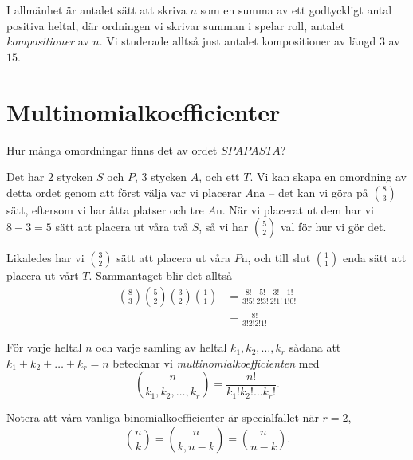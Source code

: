 \documentclass[nobib]{tufte-handout}
\begin{document}
\begin{definition}
  I allmänhet är antalet sätt att skriva $n$ som en summa av ett godtyckligt antal positiva heltal, där ordningen vi skrivar summan i spelar roll, antalet \emph{kompositioner} av $n$. Vi studerade alltså just antalet kompositioner av längd $3$ av $15$.
\end{definition}

\section{Multinomialkoefficienter}

\begin{example}
  Hur många omordningar finns det av ordet $SPAPASTA$?

  Det har $2$ stycken $S$ och $P$, $3$ stycken $A$, och ett $T$. Vi kan skapa en omordning av detta ordet genom att först välja var vi placerar $A$na -- det kan vi göra på $\binom{8}{3}$ sätt, eftersom vi har åtta platser och tre $A$n. När vi placerat ut dem har vi $8 - 3 = 5$ sätt att placera ut våra två $S$, så vi har $\binom{5}{2}$ val för hur vi gör det.

  Likaledes har vi $\binom{3}{2}$ sätt att placera ut våra $P$n, och till slut $\binom{1}{1}$ enda sätt att placera ut vårt $T$. Sammantaget blir det alltså
  \begin{align*}
    \binom{8}{3}\binom{5}{2}\binom{3}{2}\binom{1}{1} &= \frac{8!}{3!5!}\frac{5!}{2!3!}\frac{3!}{2!1!}\frac{1!}{1!0!}\\
    &= \frac{8!}{3!2!2!1!}
  \end{align*}
\end{example}

\begin{definition}
  För varje heltal $n$ och varje samling av heltal $k_1, k_2, \ldots, k_r$ sådana att $k_1 + k_2 + \ldots + k_r = n$ betecknar vi \emph{multinomialkoefficienten} med
  $$\binom{n}{k_1, k_2, \ldots, k_r} = \frac{n!}{k_1!k_2!\ldots k_r!}.$$

  Notera att våra vanliga binomialkoefficienter är specialfallet när $r=2$,
  $$\binom{n}{k} = \binom{n}{k, n-k} = \binom{n}{n-k}.$$
\end{definition}
\end{document}
